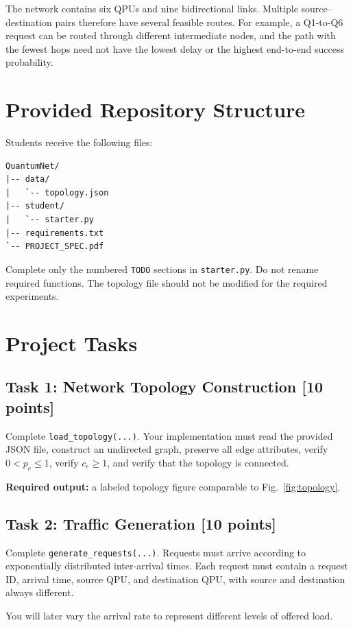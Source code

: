 \documentclass[11pt]{article}
\newcommand{\points}[1]{\hfill\textbf{[#1 points]}}
\begin{document}
The network contains six QPUs and nine bidirectional links. Multiple source--destination pairs therefore have several feasible routes. For example, a Q1-to-Q6 request can be routed through different intermediate nodes, and the path with the fewest hops need not have the lowest delay or the highest end-to-end success probability.

\section{Provided Repository Structure}

Students receive the following files:
\begin{lstlisting}
QuantumNet/
|-- data/
|   `-- topology.json
|-- student/
|   `-- starter.py
|-- requirements.txt
`-- PROJECT_SPEC.pdf
\end{lstlisting}

Complete only the numbered \texttt{TODO} sections in \texttt{starter.py}. Do not rename required functions. The topology file should not be modified for the required experiments.

\section{Project Tasks}

\subsection{Task 1: Network Topology Construction \points{10}}
Complete \texttt{load\_topology(...)}. Your implementation must read the provided JSON file, construct an undirected graph, preserve all edge attributes, verify $0<p_e\leq1$, verify $c_e\geq1$, and verify that the topology is connected.

\textbf{Required output:} a labeled topology figure comparable to Fig.~\ref{fig:topology}.

\subsection{Task 2: Traffic Generation \points{10}}
Complete \texttt{generate\_requests(...)}. Requests must arrive according to exponentially distributed inter-arrival times. Each request must contain a request ID, arrival time, source QPU, and destination QPU, with source and destination always different.

You will later vary the arrival rate to represent different levels of offered load.
\end{document}
